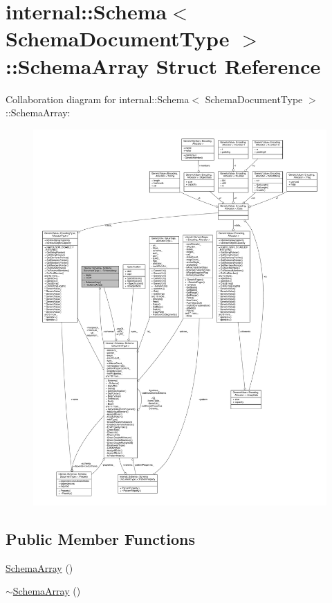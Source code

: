 \hypertarget{structinternal_1_1Schema_1_1SchemaArray}{}\section{internal\+:\+:Schema$<$ Schema\+Document\+Type $>$\+:\+:Schema\+Array Struct Reference}
\label{structinternal_1_1Schema_1_1SchemaArray}


Collaboration diagram for internal\+:\+:Schema$<$ Schema\+Document\+Type $>$\+:\+:Schema\+Array\+:
\nopagebreak
\begin{figure}[H]
\begin{center}
\leavevmode
\includegraphics[width=350pt]{structinternal_1_1Schema_1_1SchemaArray__coll__graph}
\end{center}
\end{figure}
\subsection*{Public Member Functions}
\begin{DoxyCompactItemize}
\item 
\hyperlink{structinternal_1_1Schema_1_1SchemaArray_a062fd366af3b0accd2f6f5d6a379183c}{Schema\+Array} ()
\item 
\hyperlink{structinternal_1_1Schema_1_1SchemaArray_a9745826807e4dede68ef3b9287afa867}{$\sim$\+Schema\+Array} ()
\end{DoxyCompactItemize}
